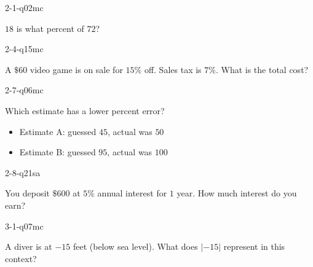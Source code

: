\documentclass[12pt, fleqn, openany]{studyGuide}
\begin{document}
\begin{practiceQuestion}{2-1-q02}{mc}
\begin{questionText}
$18$ is what percent of $72$?
\end{questionText}
\end{practiceQuestion}

\begin{practiceQuestion}{2-4-q15}{mc}
\begin{questionText}
A $\$60$ video game is on sale for $15\%$ off. Sales tax is $7\%$. What is the total cost?
\end{questionText}
\end{practiceQuestion}

\begin{practiceQuestion}{2-7-q06}{mc}
\begin{questionText}
Which estimate has a lower percent error?
\begin{itemize}
    \item Estimate A: guessed $45$, actual was $50$
    \item Estimate B: guessed $95$, actual was $100$
\end{itemize}
\end{questionText}
\end{practiceQuestion}

\begin{practiceQuestion}{2-8-q21}{sa}
\begin{questionText}
You deposit $\$600$ at $5\%$ annual interest for $1$ year. How much interest do you earn?
\end{questionText}
\end{practiceQuestion}

\begin{practiceQuestion}{3-1-q07}{mc}
\begin{questionText}
A diver is at $-15$ feet (below sea level). What does $|-15|$ represent in this context?
\end{questionText}
\end{practiceQuestion}
\end{document}
